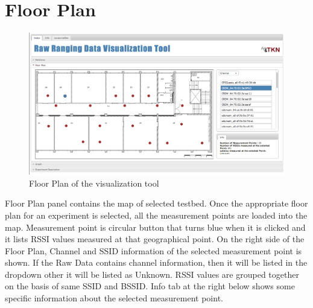 \documentclass[11pt,a4paper,headinclude,footinclude,chapterprefix=on]{scrreprt}
\begin{document}
\section{Floor Plan} 
\begin{figure}
	[!] \centering 
	\includegraphics[width=15cm]{Images/tool_floor.png} \caption{Floor Plan of the visualization tool} \label{fig:tool:floor} 
\end{figure}
Floor Plan panel contains the map of selected testbed. Once the appropriate floor plan for an experiment is selected, all the measurement points are loaded into the map. Measurement point is circular button that turns blue when it is clicked and it lists RSSI values measured at that geographical point. On the right side of the Floor Plan, Channel and SSID information of the selected measurement point is shown. If the Raw Data contains channel information, then it will be listed in the dropdown other it will be listed as Unknown. RSSI values are grouped together on the basis of same SSID and BSSID. Info tab at the right below shows some specific information about the selected measurement point.
\end{document}
